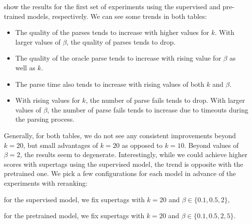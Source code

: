 \documentclass[../../document.tex]{subfiles}
\begin{document}
     show the results for the first set of experiments using the supervised and pre-trained models, respectively.
    We can see some trends in both tables:
    \begin{itemize}
        \item The quality of the parses tends to increase with higher values for $k$.  With larger values of \(\beta\), the quality of parses tends to drop.
        \item The quality of the oracle parse tends to increase with rising value for $\beta$ as well as \(k\).
        \item The parse time also tends to increase with rising values of both \(k\) and \(\beta\).
        \item With rising values for $k$, the number of parse fails tends to drop. With larger values of \(\beta\), the number of parse fails tends to increase due to timeouts during the parsing process.
    \end{itemize}
    Generally, for both tables, we do not see any consistent improvements beyond \(k=20\), but small advantages of \(k=20\) as opposed to \(k=10\).
    Beyond values of \(\beta = 2\), the results seem to degenerate.
    Interestingly, while we could achieve higher scores with  supertags using the supervised model, the trend is opposite with the pretrained one.
    We pick a few configurations for each model in advance of the experiments with reranking:
    \begin{compactitem}
        \item for the supervised model, we fix  supertags with \(k = 20\) and \(\beta \in \{0.1,0.5,2\}\),
        \item for the pretrained model, we fix  supertags with \(k = 20\) and \(\beta \in \{0.1,0.5,2,5\}\).
    \end{compactitem}
    
\end{document}
